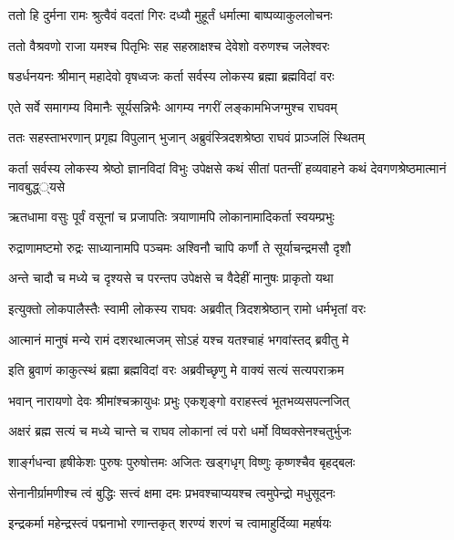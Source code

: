 
\twolineshloka
{ततो हि दुर्मना रामः श्रुत्वैवं वदतां गिरः}
{दध्यौ मुहूर्तं धर्मात्मा बाष्पव्याकुललोचनः} %

\twolineshloka
{ततो वैश्रवणो राजा यमश्च पितृभिः सह}
{सहस्राक्षश्च देवेशो वरुणश्च जलेश्वरः} %

\twolineshloka
{षडर्धनयनः श्रीमान् महादेवो वृषध्वजः}
{कर्ता सर्वस्य लोकस्य ब्रह्मा ब्रह्मविदां वरः} %

\twolineshloka
{एते सर्वे समागम्य विमानैः सूर्यसन्निभैः}
{आगम्य नगरीं लङ्कामभिजग्मुश्च राघवम्} %

\twolineshloka
{ततः सहस्ताभरणान् प्रगृह्य विपुलान् भुजान्}
{अब्रुवंस्त्रिदशश्रेष्ठा राघवं प्राञ्जलिं स्थितम्} %

\threelineshloka
{कर्ता सर्वस्य लोकस्य श्रेष्ठो ज्ञानविदां विभुः}
{उपेक्षसे कथं सीतां पतन्तीं हव्यवाहने}
{कथं देवगणश्रेष्ठमात्मानं नावबुद्ध््यसे} %

\twolineshloka
{ऋतधामा वसुः पूर्वं वसूनां च प्रजापतिः}
{त्रयाणामपि लोकानामादिकर्ता स्वयम्प्रभुः} %

\twolineshloka
{रुद्राणामष्टमो रुद्रः साध्यानामपि पञ्चमः}
{अश्विनौ चापि कर्णौ ते सूर्याचन्द्रमसौ दृशौ} %

\twolineshloka
{अन्ते चादौ च मध्ये च दृश्यसे च परन्तप}
{उपेक्षसे च वैदेहीं मानुषः प्राकृतो यथा} %

\twolineshloka
{इत्युक्तो लोकपालैस्तैः स्वामी लोकस्य राघवः}
{अब्रवीत् त्रिदशश्रेष्ठान् रामो धर्मभृतां वरः} %

\twolineshloka
{आत्मानं मानुषं मन्ये रामं दशरथात्मजम्}
{सोऽहं यश्च यतश्चाहं भगवांस्तद् ब्रवीतु मे} %

\twolineshloka
{इति ब्रुवाणं काकुत्स्थं ब्रह्मा ब्रह्मविदां वरः}
{अब्रवीच्छृणु मे वाक्यं सत्यं सत्यपराक्रम} %

\twolineshloka
{भवान् नारायणो देवः श्रीमांश्चक्रायुधः प्रभुः}
{एकशृङ्गो वराहस्त्वं भूतभव्यसपत्नजित्} %

\twolineshloka
{अक्षरं ब्रह्म सत्यं च मध्ये चान्ते च राघव}
{लोकानां त्वं परो धर्मो विष्वक्सेनश्चतुर्भुजः} %

\twolineshloka
{शार्ङ्गधन्वा हृषीकेशः पुरुषः पुरुषोत्तमः}
{अजितः खड्गधृग् विष्णुः कृष्णश्चैव बृहद्बलः} %

\twolineshloka
{सेनानीर्ग्रामणीश्च त्वं बुद्धिः सत्त्वं क्षमा दमः}
{प्रभवश्चाप्ययश्च त्वमुपेन्द्रो मधुसूदनः} %

\twolineshloka
{इन्द्रकर्मा महेन्द्रस्त्वं पद्मनाभो रणान्तकृत्}
{शरण्यं शरणं च त्वामाहुर्दिव्या महर्षयः} %

